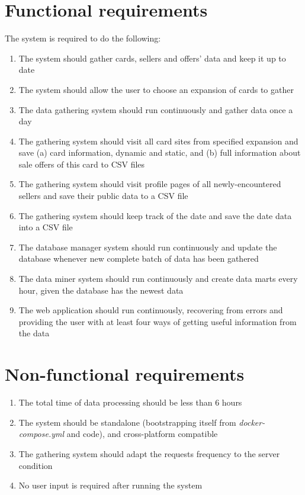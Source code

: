 \section{Functional requirements}
The system is required to do the following:
\begin{enumerate}
    \item The system should gather cards, sellers and offers' data and keep it up to date
    \item The system should allow the user to choose an expansion of cards to gather
    \item The data gathering system should run continuously and gather data once a day
    \item The gathering system should visit all card sites from specified expansion and save (a) card information, dynamic and static, and (b) full information about sale offers of this card to CSV files
    \item The gathering system should visit profile pages of all newly-encountered sellers and save their public data to a CSV file
    \item The gathering system should keep track of the date and save the date data into a CSV file
    \item The database manager system should run continuously and update the database whenever new complete batch of data has been gathered
    \item The data miner system should run continuously and create data marts every hour, given the database has the newest data
    \item The web application should run continuously, recovering from errors and providing the user with at least four ways of getting useful information from the data
\end{enumerate}


\section{Non-functional requirements}
\begin{enumerate}
    \item The total time of data processing should be less than 6 hours
    \item The system should be standalone (bootstrapping itself from \textit{docker-compose.yml} and code), and cross-platform compatible
    \item The gathering system should adapt the requests frequency to the server condition
    \item No user input is required after running the system
\end{enumerate}


